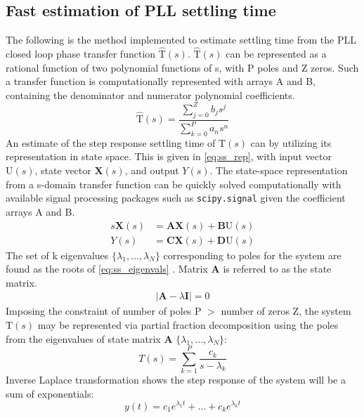 \subsection{Fast estimation of PLL settling time}\label{est_set}
	The following is the method implemented to estimate settling time from the PLL closed loop phase transfer function $\mathrm{\hat{T}}(s)$. $\mathrm{\hat{T}}(s)$ can be represented as a rational function of two polynomial functions of s, with P poles and Z zeros. Such a transfer function is computationally represented with arrays A and B, containing the denominator and numerator polynomial coefficients.
	\begin{equation}\label{eq:pll_cl_tf}
	\mathrm{\hat{T}}(s) = \frac{\sum_{j=0}^Z b_js^j}{\sum_{k=0}^P a_ns^n}
	\end{equation}
	An estimate of the step response settling time of $\mathrm{T}(s)$ can by utilizing its representation in state space. This is given in \ref{eq:ss_rep}, with input vector $\mathrm{U}(s)$, state vector $\mathbf{X}(s)$, and output $Y(s)$. The state-space representation from a s-domain transfer function can be quickly solved computationally with available signal processing packages such as \texttt{scipy.signal} \cite{scipy.signal} given the coefficient arrays A and B.
	\begin{align} \label{eq:ss_rep}
		s\mathbf{X}(s) &= \mathbf{AX}(s) +\mathbf{B}\mathrm{U}(s)\\
		Y(s) &= \mathbf{CX}(s) +\mathbf{D}\mathrm{U}(s)
	\end{align}
	The set of k eigenvalues $\{\lambda_1, ... , \lambda_{N}\}$ corresponding to poles for the system are found as the roots of \ref{eq:ss_eigenvals} \cite{brockett_1965}. Matrix $\mathbf{A}$ is referred to as the state matrix.%
	\begin{align}
		|\mathbf{A} - \lambda \mathbf{I}| = 0\label{eq:ss_eigenvals}%
	\end{align}
	Imposing the constraint of number of poles P $>$ number of zeros Z, the system $\mathrm{T}(s)$ may be represented via partial fraction decomposition using the poles from the eigenvalues of state matrix $\mathbf{A}$ $\{\lambda_1, ... , \lambda_{N}\}$:
	\begin{equation}
		T(s) = \sum_{k=1}^{P} \frac{c_k}{s-\lambda_k}
	\end{equation}
	Inverse Laplace transformation shows the step response of the system will be a sum of exponentials:
	\begin{equation}
		y(t) = c_1e^{\lambda_1t} + ... + c_ke^{\lambda_kt}%
	\end{equation}

